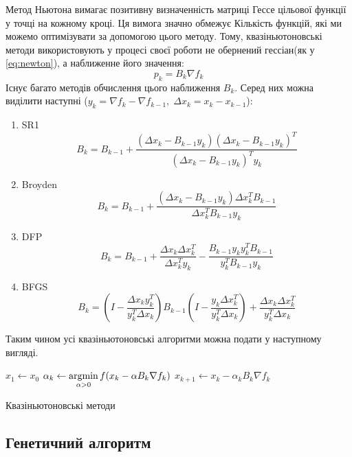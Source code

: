 Метод Ньютона вимагає позитивну визначенність матриці Гессе
цільової функції у точці на кожному кроці. Ця вимога значно обмежує
Кількість функцій, які ми можемо оптимізувати за допомогою
цього методу. Тому, квазіньютоновські методи використовують
у процесі своєї роботи не обернений гессіан(як у \ref{eq:newton}),
а наближенне його значення:
\begin{equation}
    p_k = B_k \nabla f_k
\end{equation}
Існує багато методів обчислення цього наближення $B_k$.
Серед них можна виділити наступні
($y_k = \nabla f_k - \nabla f_{k-1}, \;
\Delta x_k = x_k - x_{k-1} $):
\begin{enumerate}
    \item SR1
    $$ B_k = B_{k-1} + \frac{(\Delta x_{k} - B_{k-1}y_k)
    (\Delta x_{k} - B_{k-1}y_k)^{T}}
    {(\Delta x_{k} - B_{k-1}y_k)^{T}y_k} $$
    \item Broyden
    $$ B_k = B_{k-1} + \frac{(\Delta x_{k} - B_{k-1}y_k)
    \Delta x_{k}^{T}B_{k-1}}
    {\Delta x_{k}^{T}B_{k-1}y_k} $$
    \item DFP
    $$ B_k = B_{k-1} + \frac{\Delta x_{k}\Delta x_{k}^{T}}
    {\Delta x_{k}^{T}y_k} - \frac{B_{k-1}y_ky_k^{T}B_{k-1}}{y_k^{T}B_{k-1}y_k} $$
    \item BFGS
    $$ B_k = \left( I - \frac{\Delta x_{k}y_k^{T}}{y_k^{T}\Delta x_k} \right) B_{k-1}
    \left( I - \frac{y_k \Delta x_{k}^{T}}{y_k^{T}\Delta x_k} \right) +
    \frac{\Delta x_{k}\Delta x_{k}^{T}}{y_k^{T}\Delta x_k}
     $$
\end{enumerate}

Таким чином усі квазіньютоновські алгоритми можна подати у наступному
вигляді.

\begin{algorithm}[H] \label{alg:newton}
    \SetAlgoLined
    $x_1 \leftarrow x_0$\;
    {
        $\alpha_k \leftarrow \mathop{\mathrm{argmin}}\limits_{\alpha > 0} f(x_{k} - \alpha B_k \nabla f_{k})$\;
        $x_{k+1} \leftarrow x_{k} - \alpha_k B_k \nabla f_{k}$\;
    }
    \caption{Квазіньютоновські методи}
\end{algorithm}

\subsection*{Генетичний алгоритм}